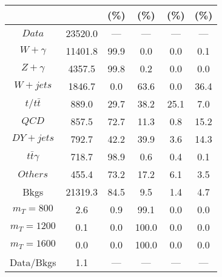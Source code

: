 \begin{figure}
\begin{minipage}[c]{0.32\textwidth}
{\begin{tabular}{cccccc}
 &  & (\%) & (\%) & (\%) & (\%)  \\
\hline
                                                                      $ Data $ &  23520.0 &  --- &  --- &  --- &  ---\\
$ W+\gamma $ &  11401.8 &  99.9 &  0.0 &  0.0 &  0.1\\
$ Z+\gamma $ &  4357.5 &  99.8 &  0.2 &  0.0 &  0.0\\
$ W+jets $ &  1846.7 &  0.0 &  63.6 &  0.0 &  36.4\\
$ t/t\bar{t} $ &  889.0 &  29.7 &  38.2 &  25.1 &  7.0\\
$ QCD $ &  857.5 &  72.7 &  11.3 &  0.8 &  15.2\\
$ DY+jets $ &  792.7 &  42.2 &  39.9 &  3.6 &  14.3\\
$ t\bar{t}\gamma $ &  718.7 &  98.9 &  0.6 &  0.4 &  0.1\\
$ Others $ &  455.4 &  73.2 &  17.2 &  6.1 &  3.5\\
Bkgs &  21319.3 &  84.5 &  9.5 &  1.4 &  4.7\\
$ m_{T} = 800 $ &  2.6 &  0.9 &  99.1 &  0.0 &  0.0\\
$ m_{T} = 1200 $ &  0.1 &  0.0 &  100.0 &  0.0 &  0.0\\
$ m_{T} = 1600 $ &  0.0 &  0.0 &  100.0 &  0.0 &  0.0\\
Data/Bkgs &  1.1 &  --- &  --- &  --- &  ---\\
\hline
\end{tabular}
}
\end{minipage}
\end{figure}

